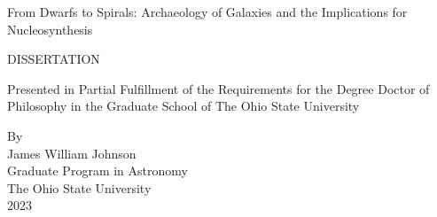 %
%
%
%
%
%

\begin{titlepage}

%
%


\begin{center}
\begin{singlespace}
\vspace*{1.3cm}
{\Large
From Dwarfs to Spirals: Archaeology of Galaxies and the Implications for
Nucleosynthesis
}
\end{singlespace}

%
%
%
%
%

\vspace*{1.5cm}

DISSERTATION\\
\vspace*{1.5cm}
\begin{singlespace}
Presented in Partial Fulfillment of the Requirements for
the Degree Doctor of Philosophy in the Graduate School of The Ohio 
State University\\
\end{singlespace}
\vspace*{1.0cm}


%
%
%
\begin{doublespace}
By
\\
James William Johnson
\\
Graduate Program in Astronomy
\\
\vspace*{1.0cm}
The Ohio State University\\
2023\\


\end{doublespace}
\end{center}
\end{titlepage}
